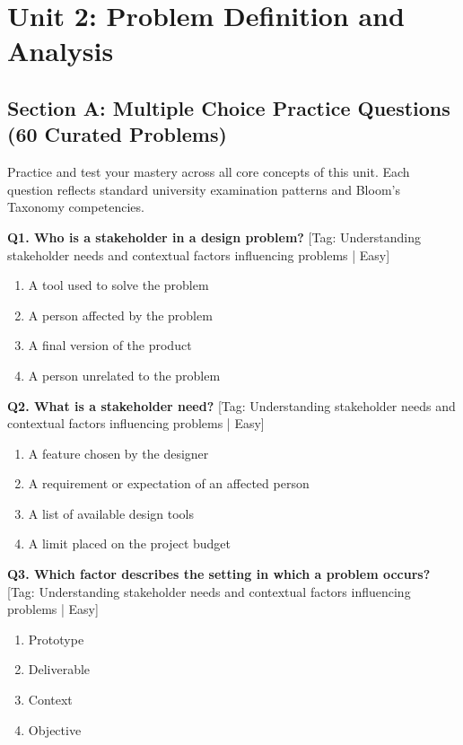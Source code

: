 \chapter{Unit 2: Problem Definition and Analysis}


\section{Section A: Multiple Choice Practice Questions (60 Curated Problems)}

\noindent Practice and test your mastery across all core concepts of this unit. Each question reflects standard university examination patterns and Bloom's Taxonomy competencies.
\vspace{3mm}

\noindent\textbf{Q1. Who is a stakeholder in a design problem?} \hfill [Tag: Understanding stakeholder needs and contextual factors influencing problems | Easy]
\begin{enumerate}[label=(\alph*),topsep=2pt,itemsep=1pt,partopsep=0pt,parsep=0pt]
    \item {A tool used to solve the problem}
    \item {A person affected by the problem}
    \item {A final version of the product}
    \item {A person unrelated to the problem}
\end{enumerate}
\vspace{2mm}

\noindent\textbf{Q2. What is a stakeholder need?} \hfill [Tag: Understanding stakeholder needs and contextual factors influencing problems | Easy]
\begin{enumerate}[label=(\alph*),topsep=2pt,itemsep=1pt,partopsep=0pt,parsep=0pt]
    \item {A feature chosen by the designer}
    \item {A requirement or expectation of an affected person}
    \item {A list of available design tools}
    \item {A limit placed on the project budget}
\end{enumerate}
\vspace{2mm}

\noindent\textbf{Q3. Which factor describes the setting in which a problem occurs?} \hfill [Tag: Understanding stakeholder needs and contextual factors influencing problems | Easy]
\begin{enumerate}[label=(\alph*),topsep=2pt,itemsep=1pt,partopsep=0pt,parsep=0pt]
    \item {Prototype}
    \item {Deliverable}
    \item {Context}
    \item {Objective}
\end{enumerate}
\vspace{2mm}

